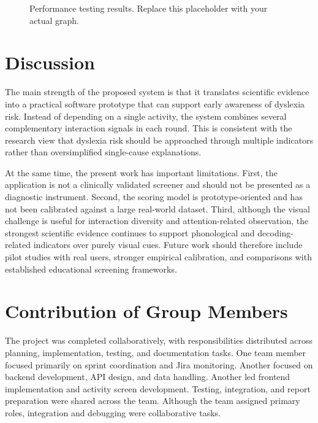 \documentclass[conference]{IEEEtran}
\begin{document}
\begin{figure}[htbp]
\centering
{}
\caption{Performance testing results. Replace this placeholder with your actual graph.}
\label{fig:performance_results}
\end{figure}

\section{Discussion}

The main strength of the proposed system is that it translates scientific evidence into a practical software prototype that can support early awareness of dyslexia risk. Instead of depending on a single activity, the system combines several complementary interaction signals in each round. This is consistent with the research view that dyslexia risk should be approached through multiple indicators rather than oversimplified single-cause explanations.

At the same time, the present work has important limitations. First, the application is not a clinically validated screener and should not be presented as a diagnostic instrument. Second, the scoring model is prototype-oriented and has not been calibrated against a large real-world dataset. Third, although the visual challenge is useful for interaction diversity and attention-related observation, the strongest scientific evidence continues to support phonological and decoding-related indicators over purely visual cues. Future work should therefore include pilot studies with real users, stronger empirical calibration, and comparisons with established educational screening frameworks.

\section{Contribution of Group Members}

The project was completed collaboratively, with responsibilities distributed across planning, implementation, testing, and documentation tasks. One team member focused primarily on sprint coordination and Jira monitoring. Another focused on backend development, API design, and data handling. Another led frontend implementation and activity screen development. Testing, integration, and report preparation were shared across the team. Although the team assigned primary roles, integration and debugging were collaborative tasks.
\end{document}
